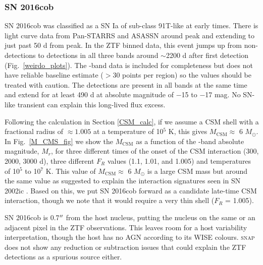 \documentclass[a4paper,oneside,12pt, class=Latex/Classes/PhDthesisPSnPDF, crop=false]{standalone}
\begin{document}
\subsubsection*{SN 2016cob}
SN 2016cob was classified as a SN Ia of sub-class 91T-like at early times. There is light curve data from Pan-STARRS and ASASSN around peak and extending to just past 50 d from peak. In the ZTF binned data, this event jumps up from non-detections to detections in all three bands around $\sim$2200 d after first detection (Fig.~\ref{weirdo_plots}). The \ztfi-band data is included for completeness but does not have reliable baseline estimate ($>$30 points per region) so the values should be treated with caution. The detections are present in all bands at the same time and extend for at least 490 d at absolute magnitude of $-$15 to $-$17 mag. No SN-like transient can explain this long-lived flux excess.

Following the calculation in Section \ref{CSM_calc}, if we assume a CSM shell with a fractional radius of $\approx 1.005$ at a temperature of 10$^5$ K, this gives $M_\text{CSM}\approx$ 6 $M_\odot$. In Fig.~\ref{M_CMS_fig} we show the $M_\text{CSM}$ as a function of the \ztfr-band absolute magnitude, $M_r$, for three different times of the onset of the CSM interaction (300, 2000, 3000 d), three different $F_R$ values (1.1, 1.01, and 1.005) and temperatures of 10$^5$ to 10$^7$ K. This value of $M_\text{CSM}\approx$ 6 $M_\odot$ is a large CSM mass but around the same value as suggested to explain the interaction signatures seen in SN 2002ic \citep{Hamuy_02ic}. Based on this, we put SN 2016cob forward as a candidate late-time CSM interaction, though we note that it would require a very thin shell ($F_R$ = 1.005).

SN 2016cob is 0.7$^{\prime\prime}$ from the host nucleus, putting the nucleus on the same or an adjacent pixel in the ZTF observations. This leaves room for a host variability interpretation, though the host has no AGN according to its WISE colours. \textsc{snap} does not show any reduction or subtraction issues that could explain the ZTF detections as a spurious source either. 
\end{document}
